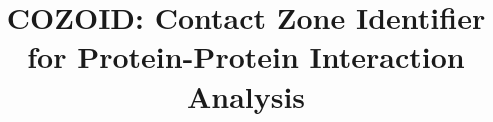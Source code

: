 \documentclass{bmcart}
\begin{document}
\begin{frontmatter}

\begin{fmbox}


\title{COZOID: Contact Zone Identifier for Protein-Protein Interaction Analysis}

\author[
   addressref={aff1},
   email={furmanova@mail.muni.cz}
]{ }
\author[
   addressref={aff2},     %
   email={jan.byska@gmail.com}   %
]{ }
\author[
   addressref={aff3},             %
   email={groeller@cg.tuwien.ac.at}   %
]{ }
\author[
   addressref={aff3},             %
   email={viola@cg.tuwien.ac.at}   %
]{ }
\author[
   addressref={aff1},             %
   email={jpalecek@sci.muni.cz}   %
]{ }
\author[
   addressref={aff1},             %
   email={kozlikova@fi.muni.cz}   %
]{ }



\end{fmbox}
\end{frontmatter}
\end{document}
